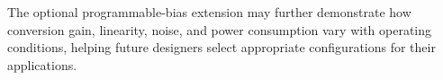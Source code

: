 \documentclass[11pt,letterpaper]{article}
\begin{document}
The optional programmable-bias extension may further
demonstrate how conversion gain, linearity, noise, and
power consumption vary with operating conditions,
helping future designers select appropriate
configurations for their applications.



\end{document}
